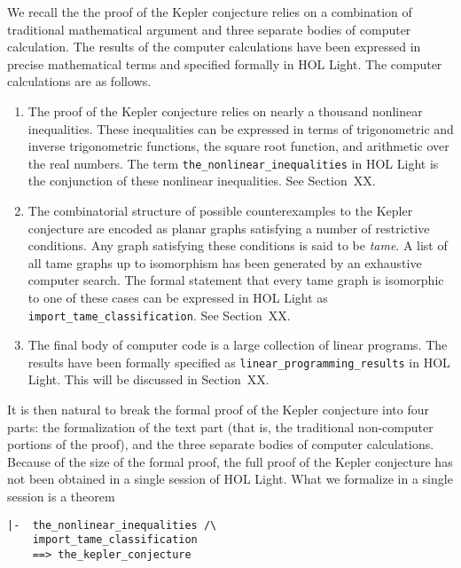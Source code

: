 We recall the the proof of the Kepler conjecture relies on a combination of traditional mathematical argument
and three separate bodies of computer calculation.   The results of the computer calculations have been expressed
in precise mathematical terms and specified formally in HOL Light.  The computer calculations are as follows.
\begin{enumerate}
\item The proof of the Kepler conjecture relies on nearly a thousand nonlinear inequalities.  These inequalities can
be expressed in terms of trigonometric and inverse trigonometric functions, the square root function, and arithmetic over
the real numbers.  The term \verb!the_nonlinear_inequalities! in HOL Light is the conjunction of these nonlinear
inequalities.  See Section~XX.
\item The combinatorial structure of possible counterexamples to the Kepler conjecture are encoded as planar graphs
satisfying a number of restrictive conditions.  Any graph satisfying these conditions is said to be {\it tame}.  A list of
all tame graphs up to isomorphism has been generated by an exhaustive computer search.  The formal statement  that every
tame graph is isomorphic to one of these cases can be expressed in HOL Light as 
\verb!import_tame_classification!.  See Section~XX.
\item The final body of computer code  is a large collection of linear programs.  The results have
been formally specified as \verb!linear_programming_results! in HOL Light.
This will be discussed in Section~XX.
\end{enumerate}

It is then natural to break the formal proof of the Kepler conjecture
into four parts: the formalization of the text part (that is, the
traditional non-computer portions of the proof), and the three
separate bodies of computer calculations.  Because of the size of the
formal proof, the full proof of the Kepler conjecture has not been
obtained in a single session of HOL Light.  What we formalize in a
single session is a theorem

\begin{obeylines}

\begin{verbatim}
|-  the_nonlinear_inequalities /\
    import_tame_classification
    ==> the_kepler_conjecture
\end{verbatim}

\end{obeylines}


